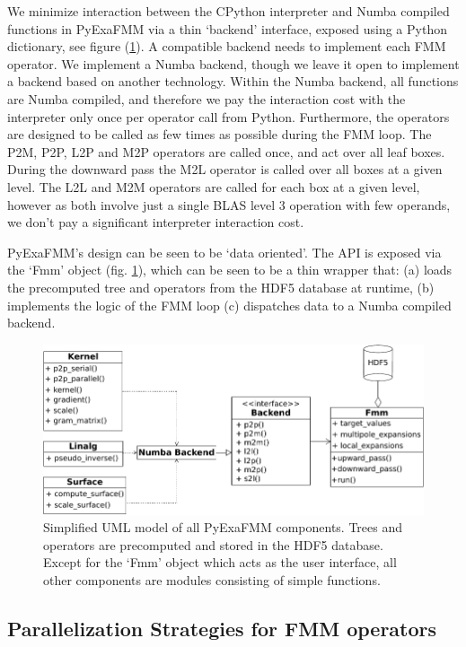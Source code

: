 \documentclass{IEEEcsmag}
\begin{document}
We minimize interaction between the CPython interpreter and Numba compiled functions in PyExaFMM via a thin `backend' interface, exposed using a Python dictionary, see figure (\ref{fig:design}). A compatible backend needs to implement each FMM operator. We implement a Numba backend, though we leave it open to implement a backend based on another technology. Within the Numba backend, all functions are Numba compiled, and therefore we pay the interaction cost with the interpreter only once per operator call from Python. Furthermore, the operators are designed to be called as few times as possible during the FMM loop. The P2M, P2P, L2P and M2P operators are called once, and act over all leaf boxes. During the downward pass the M2L operator is called over all boxes at a given level. The L2L and M2M operators are called for each box at a given level, however as both involve just a single BLAS level 3 operation with few operands, we don't pay a significant interpreter interaction cost.

PyExaFMM's design can be seen to be `data oriented'. The API is exposed via the `Fmm' object (fig. \ref{fig:design}), which can be seen to be a thin wrapper that: (a) loads the precomputed tree and operators from the HDF5 database at runtime, (b) implements the logic of the FMM loop (c) dispatches data to a Numba compiled backend.

\begin{figure}
	\centerline{\includegraphics {figures/software.pdf}}
	\caption{Simplified UML model of all PyExaFMM components. Trees and operators are precomputed and stored in the HDF5 database. Except for the `Fmm' object which acts as the user interface, all other components are modules consisting of simple functions.}
	\label{fig:design}
\end{figure}

\subsection{Parallelization Strategies for FMM operators}
\end{document}
